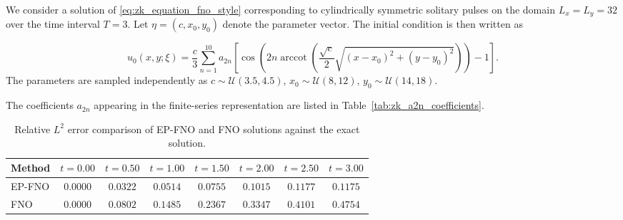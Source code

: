 \documentclass[11pt,a4paper]{article}
\DeclareMathOperator{\arccot}{arccot}
\theoremstyle{definition}
\theoremstyle{remark}
\numberwithin{equation}{section}
\numberwithin{figure}{section}
\numberwithin{table}{section}
\begin{document}
We consider a solution of \eqref{eq:zk_equation_fno_style} corresponding to cylindrically symmetric solitary pulses on the domain \(L_x=L_y=32\) over the time interval \(T=3\). Let \(\eta=(c,x_0,y_0)\) denote the parameter vector. The initial condition is then written as 

\begin{equation}
u_0(x,y; \xi)
=
\frac{c}{3}
\sum_{n=1}^{10}
a_{2n}
\left[
\cos
\left(
2n\arccot
\left(
\frac{\sqrt{c}}{2}
\sqrt{(x-x_0)^2+(y-y_0)^2}
\right)
\right)
-1
\right].
\label{eq:zk_cylindrical_ic_family}
\end{equation}
The parameters are sampled independently as $c\sim\mathcal U(3.5,4.5),\,x_0\sim\mathcal U(8,12),\, y_0\sim\mathcal U(14,18).$ 

\begin{table}[H]
\centering
\caption{Coefficients \(a_{2n}\) used in the cylindrically symmetric solitary
solution of the ZK equation, following Chen et al.~\cite{chen2011multi}.}
\label{tab:zk_a2n_coefficients}
\renewcommand{\arraystretch}{1.15}
\setlength{\tabcolsep}{4pt}
\end{table}
\noindent 
The coefficients \(a_{2n}\) appearing in the finite-series representation are
listed in Table~\ref{tab:zk_a2n_coefficients}.

\begin{table}[H]
\centering
\caption{Relative $L^2$ error comparison of EP-FNO and FNO solutions against the exact solution.}
\label{tab:epfno_fno_cylindrical_zk_l2_error_comparison}
\renewcommand{\arraystretch}{1.15}
\begin{tabular}{lccccccc}
\toprule[1.5pt]
\textbf{Method} 
& \textbf{$t=0.00$} & \textbf{$t=0.50$} & \textbf{$t=1.00$} & \textbf{$t=1.50$} 
& \textbf{$t=2.00$} & \textbf{$t=2.50$} & \textbf{$t=3.00$} \\
\midrule[1.2pt]
EP-FNO 
& $\mathbf{0.0000}$ 
& $\mathbf{0.0322}$ 
& $\mathbf{0.0514}$ 
& $\mathbf{0.0755}$ 
& $\mathbf{0.1015}$ 
& $\mathbf{0.1177}$ 
& $\mathbf{0.1175}$ \\
FNO 
& \textbf{$0.0000$} 
& $0.0802$ 
& $0.1485$ 
& $0.2367$ 
& $0.3347$ 
& $0.4101$ 
& $0.4754$ \\
\bottomrule[1.5pt]
\end{tabular}
\end{table}
\end{document}
